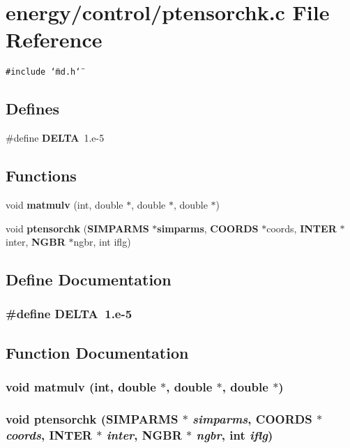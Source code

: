\section{energy/control/ptensorchk.c File Reference}
\label{ptensorchk_8c}
{\tt \#include \char`\"{}md.h\char`\"{}}\par
\subsection*{Defines}
\begin{CompactItemize}
\item 
\#define {\bf DELTA}~1.e-5
\end{CompactItemize}
\subsection*{Functions}
\begin{CompactItemize}
\item 
void {\bf matmulv} (int, double $\ast$, double $\ast$, double $\ast$)
\item 
void {\bf ptensorchk} ({\bf SIMPARMS} $\ast${\bf simparms}, {\bf COORDS} $\ast$coords, {\bf INTER} $\ast$inter, {\bf NGBR} $\ast$ngbr, int iflg)
\end{CompactItemize}


\subsection{Define Documentation}
\subsubsection{\setlength{\rightskip}{0pt plus 5cm}\#define DELTA~1.e-5}\label{ptensorchk_8c_3fd2b1bcd7ddcf506237987ad780f495}




\subsection{Function Documentation}
\subsubsection{\setlength{\rightskip}{0pt plus 5cm}void matmulv (int, double $\ast$, double $\ast$, double $\ast$)}\label{ptensorchk_8c_fbc1fbc148aff254465c9c486b397ef0}


\subsubsection{\setlength{\rightskip}{0pt plus 5cm}void ptensorchk ({\bf SIMPARMS} $\ast$ {\em simparms}, {\bf COORDS} $\ast$ {\em coords}, {\bf INTER} $\ast$ {\em inter}, {\bf NGBR} $\ast$ {\em ngbr}, int {\em iflg})}\label{ptensorchk_8c_f188549614d77490e3b051490ec1fc8e}


